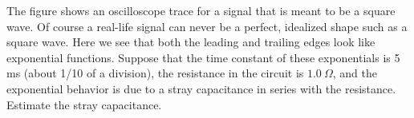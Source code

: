 The figure shows an oscilloscope trace for a signal that is meant to
be a square wave. Of course a real-life signal can never be a perfect,
idealized shape such as a square wave. Here we see that both the
leading and trailing edges look like exponential functions.
Suppose that the time constant of these exponentials is 5 ms
(about 1/10 of a division), the resistance in the circuit is
$1.0\ \Omega$, and the exponential behavior is due to a
stray capacitance in series with the resistance. Estimate the
stray capacitance.\answercheck

